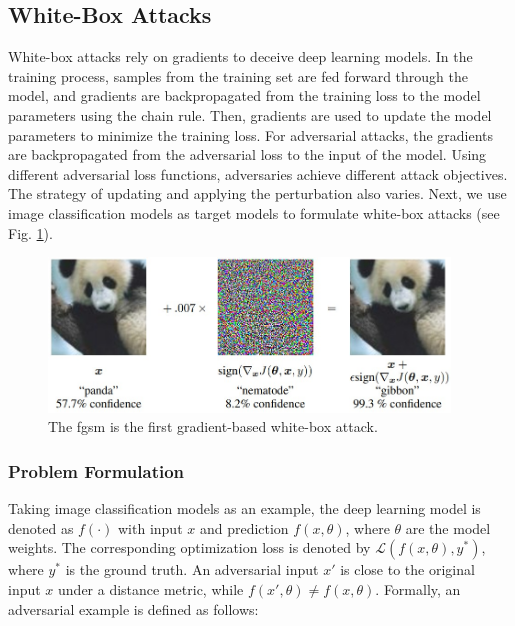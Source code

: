 \subsection{White-Box Attacks}
\label{sec:whitebox_attack}

White-box attacks rely on gradients to deceive deep learning models. In the training process, samples from the training set are fed forward through the model, and gradients are backpropagated from the training loss to the model parameters using the chain rule. Then, gradients are used to update the model parameters to minimize the training loss. For adversarial attacks, the gradients are backpropagated from the adversarial loss to the input of the model. Using different adversarial loss functions, adversaries achieve different attack objectives. The strategy of updating and applying the perturbation also varies. Next, we use image classification models as target models to formulate white-box attacks (see Fig. \ref{fig.adv_perturb}).

\begin{figure}[H]
\centering
\includegraphics[width=0.95\textwidth]{figures/chapter_intro/fgsm.jpg}
\caption{The \acrfull{fgsm}\citep{GoodfellowSS14} is the first gradient-based white-box attack.}
\label{fig.adv_perturb}
\end{figure}

\subsubsection{Problem Formulation}

Taking image classification models as an example, the deep learning model is denoted as $f(\cdot)$ with input $x$ and prediction $f(x, \theta)$, where $\theta$ are the model weights. The corresponding optimization loss is denoted by $\mathcal{L}(f(x, \theta), y^*)$, where $y^*$ is the ground truth. An adversarial input $x'$ is close to the original input $x$ under a distance metric, while $f(x', \theta) \neq f(x, \theta)$. Formally, an adversarial example is defined as follows:

